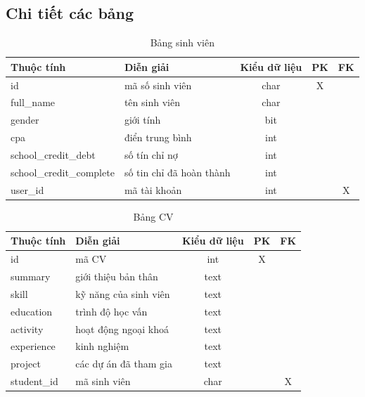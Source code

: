 \subsection{Chi tiết các bảng}
    \begin{table}[h!]
      \centering
      \begin{tabular}{|l|p{}|c|c|c|}
        \hline
        \textbf{Thuộc tính} & \textbf{Diễn giải} & \textbf{Kiểu dữ liệu} & \textbf{PK} & \textbf{FK}\\
        \hline
        id & mã số sinh viên & char & X &\\
        \hline
        full\_name & tên sinh viên & char & &\\
        \hline
        gender & giới tính & bit & &\\
        \hline
        cpa & điển trung bình & int & &\\
        \hline
        school\_credit\_debt & số tín chỉ nợ & int & &\\
        \hline
        school\_credit\_complete & số tin chỉ đã hoàn thành & int & &\\
        \hline
        user\_id & mã tài khoản & int & & X\\
        \hline
      \end{tabular}
      \caption{Bảng sinh viên}
    \end{table}

    \begin{table}[h!]
      \centering
      \begin{tabular}{|l|p{}|c|c|c|}
        \hline
        \textbf{Thuộc tính} & \textbf{Diễn giải} & \textbf{Kiểu dữ liệu} & \textbf{PK} & \textbf{FK}\\
        \hline
        id & mã CV & int & X &\\
        \hline
        summary & giới thiệu bản thân & text & &\\
        \hline
        skill & kỹ năng của sinh viên & text &  &\\
        \hline
        education & trình độ học vấn & text & &\\
        \hline
        activity & hoạt động ngoại khoá & text & &\\
        \hline
        experience & kinh nghiệm & text & &\\
        \hline
        project & các dự án đã tham gia & text & &\\
        \hline
        student\_id & mã sinh viên & char & & X\\
        \hline
      \end{tabular}
      \caption{Bảng CV}
    \end{table}

